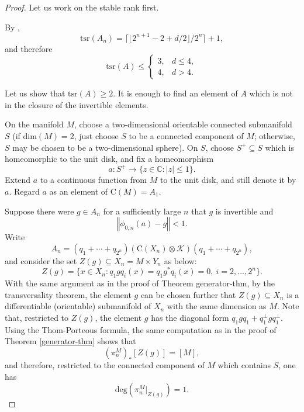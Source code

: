 \documentclass[12pt, oneside, psamsfonts]{amsart}
\theoremstyle{definition}
\theoremstyle{remark}
\numberwithin{equation}{section}
\newcommand{\norm}[1]{\left\Vert#1\right\Vert}
\newcommand{\abs}[1]{\left\vert#1\right\vert}
\newcommand{\Comp}{\mathbb C}
\begin{document}
\begin{proof}
 Let us work on the stable rank first.

By \cite{Nistor-tsr}, $$\mathrm{tsr}(A_n) = \lceil \lfloor  2^{n+1} -2 + d/2 \rfloor /2^n \rceil + 1,$$ and therefore
$$ \mathrm{tsr}(A) \leq \left\{ 
\begin{array}{ll}
3, & d \leq 4, \\
4, & d > 4.
\end{array}
\right.$$

Let us show that $ \mathrm{tsr}(A) \geq 2$. It is enough to find an element of $A$ which is not in the closure of the invertible elements. 

On the manifold $M$, choose a two-dimensional orientable connected submanifold $S$ (if $\mathrm{dim}(M) = 2$, just choose $S$ to be a connected component of $M$; otherwise, $S$ may be chosen to be a  two-dimensional sphere). On $S$, choose $S^+ \subseteq S$ which is homeomorphic to the unit disk, and fix a homeomorphism $$a: S^+ \to \{z \in \Comp: \abs{z}\leq 1\}.$$ Extend $a$ to a continuous function from $M$ to the unit disk, and still denote it by $a$. Regard $a$ as an element of $\mathrm{C}(M) = A_1$.

Suppose there were $g \in A_n$ for a sufficiently large $n$ that $g$ is invertible and 
\begin{equation}\label{approx-inv-0}
\norm{\phi_{0, n}(a) - g} < 1.
\end{equation} 
Write $$A_n = (q_1+\cdots + q_{2^n}) (\mathrm{C}(X_n)\otimes \mathcal K) (q_1+\cdots + q_{2^n}),$$ and consider the set $Z(g) \subseteq X_n=M \times Y_n$ as below:
$$Z(g) = \{x \in X_n: q_1gq_i(x) = q_1g^*q_i(x) = 0,\ i=2, ..., 2^n\}.$$ With the same argument as in the proof of Theorem {generator-thm}, by the transversality theorem, the element $g$ can be chosen further that $Z(g) \subseteq X_n$ is a differentiable (orientable) submanifold of $X_n$ with the same dimension as $M$. Note that, restricted to $Z(g)$, the element $g$ has the diagonal form $q_1 g q_1 + q_1^\perp g q_1^\perp$.
Using the Thom-Porteous formula, the same computation as in the proof of  Theorem \ref{generator-thm} shows that
$$(\pi_n^M)_*[Z(g)] = [M],$$
and therefore, restricted to the connected component of $M$ which contains $S$, one has 
$$\mathrm{deg}(\pi_n^M|_{Z(g)}) = 1.$$




\end{proof}
\end{document}
